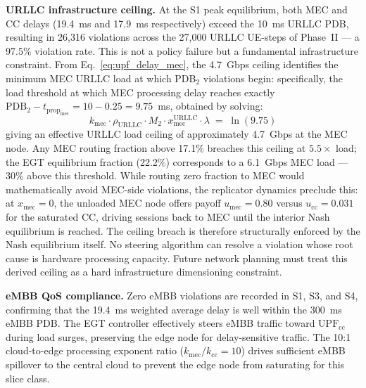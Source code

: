 \documentclass[conference]{IEEEtran}
\begin{document}
\textbf{URLLC infrastructure ceiling.}
At the S1 peak equilibrium, both MEC and CC delays
(19.4~ms and 17.9~ms respectively) exceed the 10~ms URLLC PDB,
resulting in 26,316 violations across the 27,000 URLLC UE-steps
of Phase~II --- a 97.5\% violation rate. This is not a policy
failure but a fundamental infrastructure constraint. From
Eq.~\eqref{eq:upf_delay_mec}, the 4.7~Gbps ceiling identifies
the minimum MEC URLLC load at which PDB$_2$ violations begin:
specifically, the load threshold at which MEC processing delay
reaches exactly $\text{PDB}_2 - t_{\text{prop}_\text{mec}}
= 10 - 0.25 = 9.75$~ms, obtained by solving:
\begin{equation*}
  k_\text{mec} \cdot \rho_\text{URLLC} \cdot M_2 \cdot
  x_\text{mec}^\text{URLLC} \cdot \lambda \;=\; \ln(9.75)
\end{equation*}
giving an effective URLLC load ceiling of approximately 4.7~Gbps
at the MEC node. Any MEC routing fraction above 17.1\% breaches
this ceiling at $5.5\times$ load; the EGT equilibrium fraction
(22.2\%) corresponds to a 6.1~Gbps MEC load --- 30\% above this
threshold. While routing zero fraction to MEC would mathematically
avoid MEC-side violations, the replicator dynamics preclude this:
at $x_\text{mec}=0$, the unloaded MEC node offers payoff
$u_\text{mec}=0.80$ versus $u_\text{cc}=0.031$ for the saturated
CC, driving sessions back to MEC until the interior Nash
equilibrium is reached. The ceiling breach is therefore
structurally enforced by the Nash equilibrium itself.
No steering algorithm can resolve a violation whose root cause
is hardware processing capacity. Future network planning must
treat this derived ceiling as a hard infrastructure dimensioning
constraint.

\textbf{eMBB QoS compliance.}
Zero eMBB violations are recorded in S1, S3, and S4, confirming
that the 19.4~ms weighted average delay is well within the
300~ms eMBB PDB. The EGT controller effectively steers eMBB
traffic toward $\text{UPF}_\text{cc}$ during load surges,
preserving the edge node for delay-sensitive traffic. The 10:1
cloud-to-edge processing exponent ratio ($k_\text{mec}/k_\text{cc}
= 10$) drives sufficient eMBB spillover to the central cloud to
prevent the edge node from saturating for this slice class.
\end{document}

